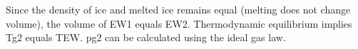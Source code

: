 Since the density of ice and melted ice remains equal (melting does not change volume), the volume of EW1 equals EW2. Thermodynamic equilibrium implies Tg2 equals TEW. pg2 can be calculated using the ideal gas law.